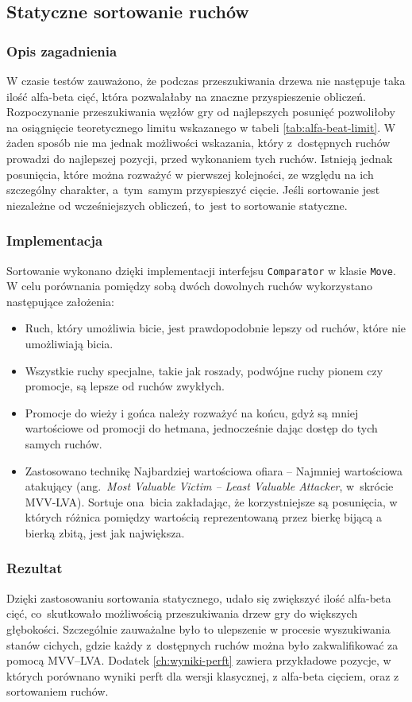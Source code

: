 \subsection{Statyczne sortowanie ruchów}
\label{subsec:sortowanie-ruchow}

\subsubsection{Opis zagadnienia}
W czasie testów zauważono, że podczas przeszukiwania drzewa nie następuje taka ilość alfa-beta cięć, która pozwalałaby na znaczne przyspieszenie obliczeń.
Rozpoczynanie przeszukiwania węzłów gry od najlepszych posunięć pozwoliłoby na osiągnięcie teoretycznego limitu wskazanego w tabeli \ref{tab:alfa-beat-limit}.
W żaden sposób nie ma jednak możliwości wskazania, który z~dostępnych ruchów prowadzi do najlepszej pozycji, przed wykonaniem tych ruchów.
Istnieją jednak posunięcia, które można rozważyć w pierwszej kolejności, ze względu na ich szczególny charakter, a~tym~samym przyspieszyć cięcie.
Jeśli sortowanie jest niezależne od wcześniejszych obliczeń, to~jest to sortowanie statyczne.

\subsubsection{Implementacja}
Sortowanie wykonano dzięki implementacji interfejsu \texttt{Comparator} w klasie \texttt{Move}.
W celu porównania pomiędzy sobą dwóch dowolnych ruchów wykorzystano następujące założenia:
\begin{itemize}
    \item Ruch, który umożliwia bicie, jest prawdopodobnie lepszy od ruchów, które nie umożliwiają bicia.
    \item Wszystkie ruchy specjalne, takie jak roszady, podwójne ruchy pionem czy promocje, są lepsze od ruchów zwykłych.
    \item Promocje do wieży i gońca należy rozważyć na końcu, gdyż są mniej wartościowe od promocji do hetmana, jednocześnie dając dostęp do tych samych ruchów.
    \item Zastosowano technikę Najbardziej wartościowa ofiara – Najmniej wartościowa atakujący (ang.~\emph{Most Valuable Victim – Least Valuable Attacker}, w~skrócie MVV-LVA). Sortuje ona~bicia zakładając, że korzystniejsze są posunięcia, w których różnica pomiędzy wartością reprezentowaną przez bierkę bijącą a bierką zbitą, jest jak największa.
\end{itemize}

\subsubsection{Rezultat}
Dzięki zastosowaniu sortowania statycznego, udało się zwiększyć ilość alfa-beta cięć, co~skutkowało możliwością przeszukiwania drzew gry do większych głębokości.
Szczególnie zauważalne było to ulepszenie w procesie wyszukiwania stanów cichych, gdzie każdy z~dostępnych ruchów można było zakwalifikować za pomocą MVV–LVA.
Dodatek \ref{ch:wyniki-perft} zawiera przykładowe pozycje, w których porównano wyniki perft dla wersji klasycznej, z alfa-beta cięciem, oraz z sortowaniem ruchów.
